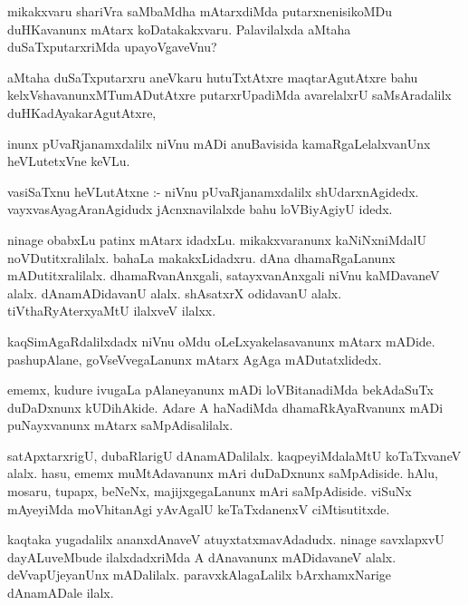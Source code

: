 \documentclass{article}
\begin{document}
\begin{mn}
mikakxvaru shariVra saMbaMdha mAtarxdiMda putarxnenisikoMDu duHKavanunx mAtarx koDatakakxvaru. 
 Palavilalxda aMtaha  duSaTxputarxriMda upayoVgaveVnu?
\end{mn}

\begin{mn}
aMtaha duSaTxputarxru aneVkaru hutuTxtAtxre maqtarAgutAtxre bahu kelxVshavanunxMTumADutAtxre 
putarxrUpadiMda avarelalxrU saMsAradalilx  duHKadAyakarAgutAtxre, 
\end{mn}

\begin{mn}
inunx pUvaRjanamxdalilx niVnu mADi anuBavisida kamaRgaLelalxvanUnx heVLutetxVne keVLu.
\end{mn}

\begin{mn}
vasiSaTxnu heVLutAtxne :- niVnu pUvaRjanamxdalilx shUdarxnAgidedx. vayxvasAyagAranAgidudx 
jAcnxnavilalxde  bahu loVBiyAgiyU idedx.
\end{mn}

\begin{mn}
ninage  obabxLu patinx mAtarx idadxLu.  mikakxvaranunx  kaNiNxniMdalU 
noVDutitxralilalx.  bahaLa makakxLidadxru.  dAna dhamaRgaLanunx 
mADutitxralilalx. dhamaRvanAnxgali, satayxvanAnxgali niVnu kaMDavaneV alalx. 
dAnamADidavanU alalx.  shAsatxrX odidavanU alalx. tiVthaRyAterxyaMtU ilalxveV ilalxx.
\end{mn}

\begin{mn}
kaqSimAgaRdalilxdadx  niVnu oMdu  oLeLxyakelasavanunx mAtarx mADide.  
pashupAlane, goVseVvegaLanunx mAtarx AgAga mADutatxlidedx.
\end{mn}

\begin{mn}
ememx, kudure ivugaLa pAlaneyanunx mADi loVBitanadiMda bekAdaSuTx duDaDxnunx 
kUDihAkide. Adare A haNadiMda dhamaRkAyaRvanunx mADi puNayxvanunx mAtarx saMpAdisalilalx.
\end{mn}

\begin{mn}
satApxtarxrigU, dubaRlarigU dAnamADalilalx.  kaqpeyiMdalaMtU koTaTxvaneV 
alalx. hasu, ememx muMtAdavanunx  mAri duDaDxnunx saMpAdiside.  hAlu,  mosaru,  
tupapx,  beNeNx,  majijxgegaLanunx mAri saMpAdiside. viSuNx mAyeyiMda  
moVhitanAgi yAvAgalU  keTaTxdanenxV ciMtisutitxde.
\end{mn}

\begin{mn}
kaqtaka yugadalilx  ananxdAnaveV  atuyxtatxmavAdadudx.  ninage savxlapxvU 
dayALuveMbude ilalxdadxriMda A dAnavanunx  mADidavaneV alalx. deVvapUjeyanUnx 
mADalilalx.  paravxkAlagaLalilx  bArxhamxNarige dAnamADale ilalx.
\end{mn}
\end{document}
